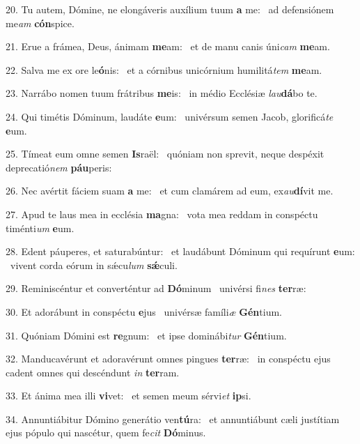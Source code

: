 20. Tu autem, Dómine, ne elongáveris auxílium tuum \textbf{a} me: \ast\  ad defensiónem me\textit{am} \textbf{cón}spice.\

21. Erue a frámea, Deus, ánimam \textbf{me}am: \ast\  et de manu canis úni\textit{cam} \textbf{me}am.\

22. Salva me ex ore le\textbf{ó}nis: \ast\  et a córnibus unicórnium humilitá\textit{tem} \textbf{me}am.\

23. Narrábo nomen tuum frátribus \textbf{me}is: \ast\  in médio Ecclésiæ \textit{lau}\textbf{dá}bo te.\

24. Qui timétis Dóminum, laudáte \textbf{e}um: \ast\  univérsum semen Jacob, glorificá\textit{te} \textbf{e}um.\

25. Tímeat eum omne semen \textbf{Is}raël: \ast\  quóniam non sprevit, neque despéxit deprecatió\textit{nem} \textbf{páu}peris:\

26. Nec avértit fáciem suam \textbf{a} me: \ast\  et cum clamárem ad eum, ex\textit{au}\textbf{dí}vit me.\

27. Apud te laus mea in ecclésia \textbf{ma}gna: \ast\  vota mea reddam in conspéctu timénti\textit{um} \textbf{e}um.\

28. Edent páuperes, et saturabúntur: \dag\  et laudábunt Dóminum qui requírunt \textbf{e}um: \ast\  vivent corda eórum in sǽcu\textit{lum} \textbf{sǽ}culi.\

29. Reminiscéntur et converténtur ad \textbf{Dó}minum \ast\  univérsi fi\textit{nes} \textbf{ter}ræ:\

30. Et adorábunt in conspéctu \textbf{e}jus \ast\  univérsæ famíli\textit{æ} \textbf{Gén}tium.\

31. Quóniam Dómini est \textbf{re}gnum: \ast\  et ipse dominábi\textit{tur} \textbf{Gén}tium.\

32. Manducavérunt et adoravérunt omnes pingues \textbf{ter}ræ: \ast\  in conspéctu ejus cadent omnes qui descéndunt \textit{in} \textbf{ter}ram.\

33. Et ánima mea illi \textbf{vi}vet: \ast\  et semen meum sérvi\textit{et} \textbf{ip}si.\

34. Annuntiábitur Dómino generátio ven\textbf{tú}ra: \ast\  et annuntiábunt cæli justítiam ejus pópulo qui nascétur, quem fe\textit{cit} \textbf{Dó}minus.\

